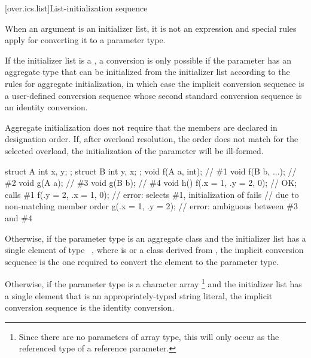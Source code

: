 [over.ics.list]{List-initialization sequence}

\pnum
When an argument is an initializer list, it is not an
expression and special rules apply for converting it to a parameter type.

\pnum
If the initializer list is a ,
a conversion is only possible if
the parameter has an aggregate type
that can be initialized from the initializer list
according to the rules for aggregate initialization,
in which case the implicit conversion sequence is
a user-defined conversion sequence
whose second standard conversion sequence
is an identity conversion.
\begin{note}
Aggregate initialization does not require that
the members are declared in designation order.
If, after overload resolution, the order does not match
for the selected overload,
the initialization of the parameter will be ill-formed.
\begin{example}
\begin{codeblock}
struct A { int x, y; };
struct B { int y, x; };
void f(A a, int);               // \#1
void f(B b, ...);               // \#2
void g(A a);                    // \#3
void g(B b);                    // \#4
void h() {
  f({.x = 1, .y = 2}, 0);       // OK; calls \#1
  f({.y = 2, .x = 1}, 0);       // error: selects \#1, initialization of  fails
                                // due to non-matching member order
  g({.x = 1, .y = 2});          // error: ambiguous between \#3 and \#4
}
\end{codeblock}
\end{example}
\end{note}

\pnum
Otherwise,
if the parameter type is an aggregate class  and the initializer list has a
single element of type \cv{}~, where  is 
or a class derived from , the implicit conversion sequence is the one
required to convert the element to the parameter type.

\pnum
Otherwise, if the parameter type is a character array%
\footnote{Since there are no parameters of array type,
this will only occur as the referenced type of a reference parameter.}
and the initializer list has a single element that is an appropriately-typed
string literal, the implicit conversion
sequence is the identity conversion.


